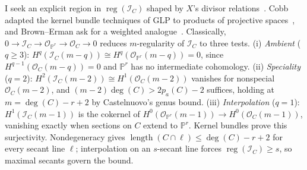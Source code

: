 \documentclass[11pt,reqno]{amsart}
\theoremstyle{remark}
\newcommand{\reg}{\operatorname{reg}}
\newcommand{\length}{\operatorname{length}}
\newcommand{\PP}{\mathbb{P}}
\newcommand{\cI}{\mathcal{I}}
\newcommand{\cO}{\mathcal{O}}
\begin{document}
I seek an explicit region in $\reg(\cI_C)$ shaped by $X$'s divisor relations~\cite{maclaganSmith04}. Cobb adapted the kernel bundle techniques of GLP to products of projective spaces~\cite{GLP83,cobb24}, and Brown--Erman ask for a weighted analogue~\cite[Ques.~7.5]{brownErman25}. Classically, $0\to\cI_C\to\cO_{\PP^r}\to\cO_C\to0$ reduces $m$-regularity of $\cI_C$ to three tests. (i) \emph{Ambient} ($q\geq3$): $H^q(\cI_C(m-q))\cong H^q(\cO_{\PP^r}(m-q))=0$, since $H^{q-1}(\cO_C(m-q))=0$ and $\PP^r$ has no intermediate cohomology. (ii) \emph{Speciality} ($q=2$): $H^2(\cI_C(m-2))\cong H^1(\cO_C(m-2))$ vanishes for nonspecial $\cO_C(m-2)$, and $(m-2)\deg(C)>2p_a(C)-2$ suffices, holding at $m=\deg(C)-r+2$ by Castelnuovo's genus bound. (iii) \emph{Interpolation} ($q=1$): $H^1(\cI_C(m-1))$ is the cokernel of $H^0(\cO_{\PP^r}(m-1))\to H^0(\cO_C(m-1))$, vanishing exactly when sections on $C$ extend to $\PP^r$. Kernel bundles prove this surjectivity. Nondegeneracy gives $\length(C\cap\ell)\leq\deg(C)-r+2$ for every secant line $\ell$; interpolation on an $s$-secant line forces $\reg(\cI_C)\geq s$, so maximal secants govern the bound.
\end{document}
